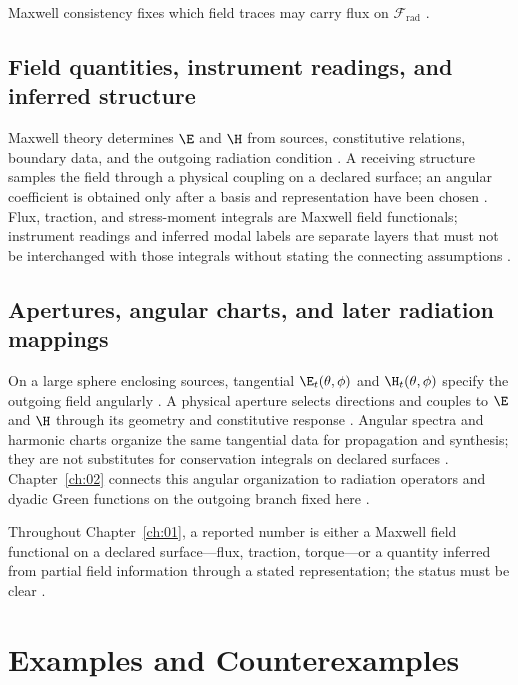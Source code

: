 Maxwell consistency fixes which field traces may carry flux on $\mathcal{F}_{\mathrm{rad}}$ \cite{stratton1941}.
\subsection{Field quantities, instrument readings, and inferred structure}
\label{sec:ch01.5.3}

Maxwell theory determines $\E$ and $\H$ from sources, constitutive relations, boundary data, and the outgoing radiation condition \cite{maxwell1873,stratton1941}. A receiving structure samples the field through a physical coupling on a declared surface; an angular coefficient is obtained only after a basis and representation have been chosen \cite{poynting1884,beth1936,hansen1988}. Flux, traction, and stress-moment integrals are Maxwell field functionals; instrument readings and inferred modal labels are separate layers that must not be interchanged with those integrals without stating the connecting assumptions \cite{stratton1941}.

\subsection{Apertures, angular charts, and later radiation mappings}
\label{sec:ch01.5.4}

On a large sphere enclosing sources, tangential $\E_t(\theta,\phi)$ and $\H_t(\theta,\phi)$ specify the outgoing field angularly \cite{stratton1941}. A physical aperture selects directions and couples to $\E$ and $\H$ through its geometry and constitutive response \cite{hansen1988}. Angular spectra and harmonic charts organize the same tangential data for propagation and synthesis; they are not substitutes for conservation integrals on declared surfaces \cite{harrington2001,stratton1941}. Chapter~\ref{ch:02} connects this angular organization to radiation operators and dyadic Green functions on the outgoing branch fixed here \cite{harrington2001,tai1994}.

\label{prop:ch1.observable-inference-criterion}
Throughout Chapter~\ref{ch:01}, a reported number is either a Maxwell field functional on a declared surface---flux, traction, torque---or a quantity inferred from partial field information through a stated representation; the status must be clear \cite{stratton1941}.

\section{Examples and Counterexamples}
\label{sec:ch01.6}

